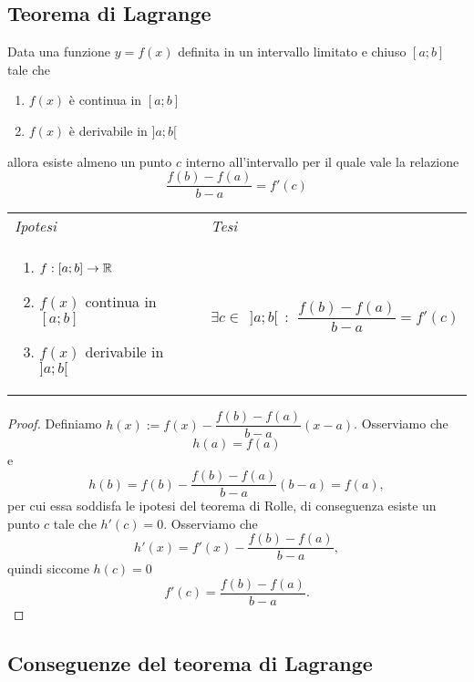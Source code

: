     \subsection{Teorema di Lagrange}\label{subsection: teorema di Lagrange}
        \begin{shadedTheorem}[Lagrange]
        Data una funzione $y=f(x)$ definita in un intervallo limitato e chiuso $[a;b]$ tale che \begin{enumerate}
            \item $f(x)$ è continua in $[a;b]$
            \item $f(x)$ è derivabile in $]a;b[$
        \end{enumerate}
        allora esiste almeno un punto $c$ interno all'intervallo per il quale vale la relazione \[\frac{f(b)-f(a)}{b-a}=f'(c)\]
        \end{shadedTheorem}
        \begin{tabular}{m{}m{}}
            \textit{Ipotesi} & \textit{Tesi}  \\
            \begin{enumerate}
            \item $f:[a;b] \to \mathbb{R}$
            \item $f(x)$ continua in $[a;b]$
            \item $f(x)$ derivabile in $]a;b[$
        \end{enumerate} & $\exists c \in~~]a;b[ ~~:~~ \dfrac{f(b)-f(a)}{b-a}=f'(c)$
        \end{tabular}
        \begin{proof}
            Definiamo $h(x):= f(x)-\dfrac{f(b)-f(a)}{b-a}(x-a)$. Osserviamo che \[h(a)=f(a)\] e \[h(b)=f(b)-\dfrac{f(b)-f(a)}{b-a}(b-a)= f(a),\]
            per cui essa soddisfa le ipotesi del teorema di Rolle, di conseguenza esiste un punto $c$ tale che $h'(c)=0$. Osserviamo che
            \[h'(x)=f'(x)-\dfrac{f(b)-f(a)}{b-a}, \]
            quindi siccome $h(c)=0$
            \[f'(c)=\dfrac{f(b)-f(a)}{b-a}.\]
        \end{proof}
        \subsection{Conseguenze del teorema di Lagrange}
